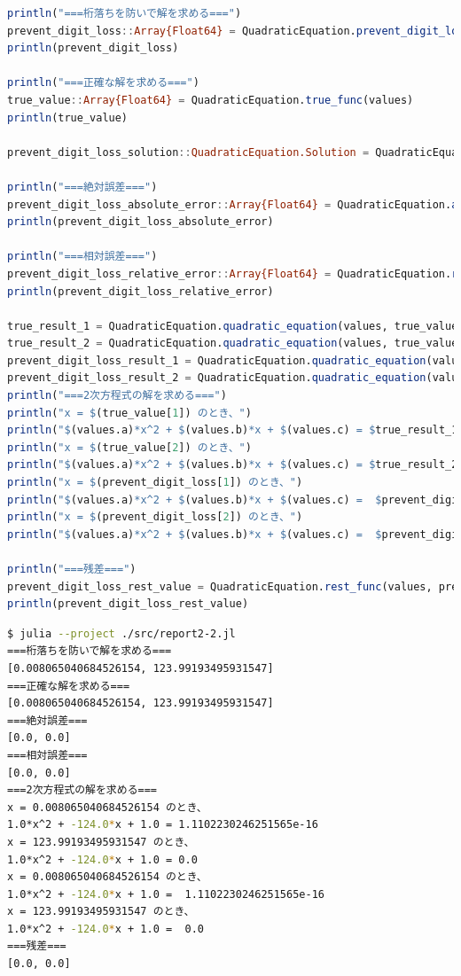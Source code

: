 \documentclass[uplatex, dvipdfmx, a4j,11pt]{jsarticle}
\begin{document}
\begin{lstlisting}[title={実行結果}, label=code:in, language=Julia]
println("===桁落ちを防いで解を求める===")
prevent_digit_loss::Array{Float64} = QuadraticEquation.prevent_digit_loss_func(values)
println(prevent_digit_loss)

println("===正確な解を求める===")
true_value::Array{Float64} = QuadraticEquation.true_func(values)
println(true_value)

prevent_digit_loss_solution::QuadraticEquation.Solution = QuadraticEquation.Solution(true_value, prevent_digit_loss)

println("===絶対誤差===")
prevent_digit_loss_absolute_error::Array{Float64} = QuadraticEquation.absolute_error_func(prevent_digit_loss_solution)
println(prevent_digit_loss_absolute_error)

println("===相対誤差===")
prevent_digit_loss_relative_error::Array{Float64} = QuadraticEquation.relative_error_func(prevent_digit_loss_solution)
println(prevent_digit_loss_relative_error)

true_result_1 = QuadraticEquation.quadratic_equation(values, true_value[1])
true_result_2 = QuadraticEquation.quadratic_equation(values, true_value[2])
prevent_digit_loss_result_1 = QuadraticEquation.quadratic_equation(values, prevent_digit_loss[1])
prevent_digit_loss_result_2 = QuadraticEquation.quadratic_equation(values, prevent_digit_loss[2])
println("===2次方程式の解を求める===")
println("x = $(true_value[1]) のとき、")
println("$(values.a)*x^2 + $(values.b)*x + $(values.c) = $true_result_1")
println("x = $(true_value[2]) のとき、")
println("$(values.a)*x^2 + $(values.b)*x + $(values.c) = $true_result_2")
println("x = $(prevent_digit_loss[1]) のとき、")
println("$(values.a)*x^2 + $(values.b)*x + $(values.c) =  $prevent_digit_loss_result_1")
println("x = $(prevent_digit_loss[2]) のとき、")
println("$(values.a)*x^2 + $(values.b)*x + $(values.c) =  $prevent_digit_loss_result_2")

println("===残差===")
prevent_digit_loss_rest_value = QuadraticEquation.rest_func(values, prevent_digit_loss_solution)
println(prevent_digit_loss_rest_value)

\end{lstlisting}

\begin{lstlisting}[title={実行結果}, label=code:in, language=sh]
$ julia --project ./src/report2-2.jl
===桁落ちを防いで解を求める===
[0.008065040684526154, 123.99193495931547]
===正確な解を求める===
[0.008065040684526154, 123.99193495931547]
===絶対誤差===
[0.0, 0.0]
===相対誤差===
[0.0, 0.0]
===2次方程式の解を求める===
x = 0.008065040684526154 のとき、
1.0*x^2 + -124.0*x + 1.0 = 1.1102230246251565e-16
x = 123.99193495931547 のとき、
1.0*x^2 + -124.0*x + 1.0 = 0.0
x = 0.008065040684526154 のとき、
1.0*x^2 + -124.0*x + 1.0 =  1.1102230246251565e-16
x = 123.99193495931547 のとき、
1.0*x^2 + -124.0*x + 1.0 =  0.0
===残差===
[0.0, 0.0]

\end{lstlisting}
\end{document}
